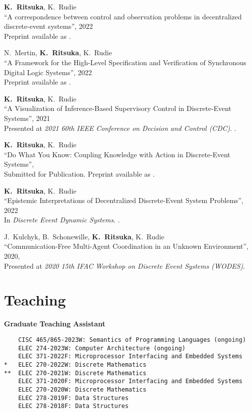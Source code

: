 \documentclass[margin]{res}
\begin{document}
\begin{resume}
{\bf K.~Ritsuka}, K.~Rudie\\
``A correspondence between control and observation problems in decentralized discrete-event systems'',
2022\\
Preprint available as .

N.~Mertin, {\bf K.~Ritsuka}, K.~Rudie\\
``A Framework for the High-Level Specification and Verification of Synchronous Digital Logic Systems'',
2022\\
Preprint available as .

{\bf K.~Ritsuka}, K.~Rudie\\
``A Visualization of Inference-Based Supervisory Control in Discrete-Event Systems'',
2021\\
Presented at \emph{2021 60th IEEE Conference on Decision and Control (CDC)}.
.

{\bf K.~Ritsuka}, K.~Rudie\\
``Do What You Know: Coupling Knowledge with Action in Discrete-Event Systems'',\\
Submitted for Publication. Preprint available as .

{\bf K.~Ritsuka}, K.~Rudie\\
``Epistemic Interpretations of Decentralized Discrete-Event System Problems'',
2022\\
In \emph{Discrete Event Dynamic Systems}.
.

J.~Kulchyk, B.~Schonewille, {\bf K.~Ritsuka}, K.~Rudie\\
``Communication-Free Multi-Agent Coordination in an Unknown Environment'',
2020,\\
Presented at \emph{2020 15th IFAC Workshop on Discrete Event Systems (WODES)}.


\section{Teaching}

\textbf{Graduate Teaching Assistant}

\begin{lstlisting}
    CISC 465/865-2023W: Semantics of Programming Languages (ongoing)
    ELEC 274-2023W: Computer Architecture (ongoing)
    ELEC 371-2022F: Microprocessor Interfacing and Embedded Systems
*   ELEC 270-2022W: Discrete Mathematics
**  ELEC 270-2021W: Discrete Mathematics
    ELEC 371-2020F: Microprocessor Interfacing and Embedded Systems
    ELEC 270-2020W: Discrete Mathematics
    ELEC 278-2019F: Data Structures
    ELEC 278-2018F: Data Structures


\end{lstlisting}
\end{resume}
\end{document}
